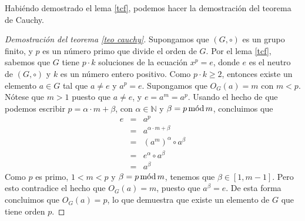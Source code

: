 Habiéndo demostrado el lema \ref{tcf}, podemos hacer la demostración del teorema de Cauchy.
\begin{proof}[Demostración del teorema \ref{teo cauchy}]
Supongamos que $(G,\circ)$ es un grupo finito, y $p$ es un número
primo que divide el orden de $G$. Por el lema \ref{tcf}, sabemos que
$G$ tiene $p\cdot k$ soluciones de la ecuación $x^p=e$, donde $e$ es
el neutro de $(G,\circ)$ y $k$ es un número entero positivo. Como
$p\cdot k \geq 2$, entonces existe un elemento $a\in G$ tal que $a\neq
e$ y $a^p=e$. Supongamos que $O_G(a)=m$ con $m<p$. Nótese que $m > 1$
puesto que $a \neq e$, y $e = a^m = a^p$. Usando el hecho de que
podemos escribir $p=\alpha \cdot m+\beta$, con $\alpha \in \mathbb{N}$
y $\beta = p \mods m$, concluimos que
\begin{eqnarray*}
	e & = & a^p \\
	&=& a^{\alpha \cdot m + \beta}\\
	&=& (a^{m})^{\alpha} \circ a^{\beta}\\
	&=& e^{\alpha}\circ a^{\beta}\\
	&=& a^{\beta}
\end{eqnarray*} 
Como $p$ es primo, $1<m<p$ y $\beta = p \mods m$, tenemos que
$\beta \in [1,m-1]$. Pero esto contradice el hecho que $O_G(a) = m$,
puesto que $a^{\beta}=e$. De esta forma concluimos que $O_G(a) = p$,
lo que demuestra que existe un elemento de $G$ que tiene orden $p$.
\end{proof}
